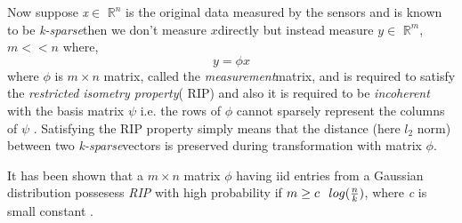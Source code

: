 \documentclass[12pt]{article}
\theoremstyle{definition}
\newtheorem{defn}{Definition}[section]
\def\ksparse{\textit{k-sparse}\hspace{0.1in}}
\def\measurement{\textit{measurement}\hspace{0.1in}}
\def\x{$x$\hspace{0.1in}}
\def\y{$y$\hspace{0.1in}}
\begin{document}
\par Now suppose \textit{x}$\in$ $\mathbb{R}^n$ is the original data measured by the sensors and 
is known to be \ksparse then we don't measure \x directly but instead measure \y$\in$ $\mathbb{R}^m$, $m << n$ where,
\begin{equation}
 y = \phi x
\end{equation}
where $\phi$ is $m\times n$ matrix, called the \measurement matrix, and is required to satisfy the \textit{restricted
isometry property}( RIP) \cite{Needell-CoSaMP}
and also it is required to be \textit{incoherent} with the basis matrix $\psi$ 
i.e. the rows of $\phi$ cannot sparsely represent the columns of $\psi$ \cite{Baraniuk-CS}.
  Satisfying the RIP property simply means that the distance (here $l_2$ norm) between two \ksparse vectors is preserved
  during transformation with matrix $\phi$.
  
 \par It has been shown that a $m \times n$ matrix $\phi$ having iid entries from a Gaussian distribution
  possesess \textit{RIP} with high probability if $m \geq c\hspace{0.1in}log(\frac{n}{k})$, 
 where \textit{c} is small constant \cite{Baraniuk-CS}.
\end{document}
